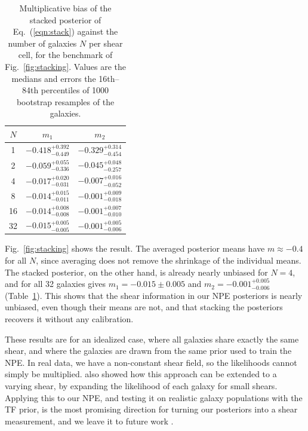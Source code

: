 \begin{table}
\centering
\caption{Multiplicative bias of the stacked posterior of Eq.~(\ref{eqn:stack}) against the number of galaxies $N$ per shear cell, for the benchmark of Fig.~\ref{fig:stacking}. Values are the medians and errors the 16th--84th percentiles of 1000 bootstrap resamples of the galaxies.}
\label{tab:stacking}
\begin{tabular}{ccc}
\toprule
$N$ & $m_1$ & $m_2$ \\
\midrule
1 & $-0.418^{+0.392}_{-0.449}$ & $-0.329^{+0.314}_{-0.454}$ \\
2 & $-0.059^{+0.055}_{-0.336}$ & $-0.045^{+0.048}_{-0.257}$ \\
4 & $-0.017^{+0.020}_{-0.031}$ & $-0.007^{+0.016}_{-0.052}$ \\
8 & $-0.014^{+0.015}_{-0.011}$ & $-0.001^{+0.009}_{-0.018}$ \\
16 & $-0.014^{+0.008}_{-0.008}$ & $-0.001^{+0.007}_{-0.010}$ \\
32 & $-0.015^{+0.005}_{-0.005}$ & $-0.001^{+0.005}_{-0.006}$ \\
\bottomrule
\end{tabular}
\end{table}

Fig.~\ref{fig:stacking} shows the result. The averaged posterior means have $m \approx -0.4$ for all $N$, since averaging does not remove the shrinkage of the individual means. The stacked posterior, on the other hand, is already nearly unbiased for $N = 4$, and for all 32 galaxies gives $m_1 = -0.015 \pm 0.005$ and $m_2 = -0.001^{+0.005}_{-0.006}$ (Table~\ref{tab:stacking}). This shows that the shear information in our NPE posteriors is nearly unbiased, even though their means are not, and that stacking the posteriors recovers it without any calibration.

These results are for an idealized case, where all galaxies share exactly the same shear, and where the galaxies are drawn from the same prior used to train the NPE. In real data, we have a non-constant shear field, so the likelihoods cannot simply be multiplied. \citep{BA14} also showed how this approach can be extended to a varying shear, by expanding the likelihood of each galaxy for small shears. Applying this to our NPE, and testing it on realistic galaxy populations with the TF prior, is the most promising direction for turning our posteriors into a shear measurement, and we leave it to future work .
